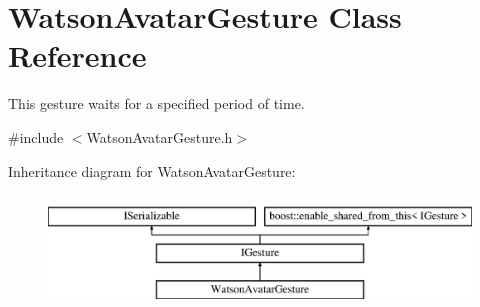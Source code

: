\hypertarget{class_watson_avatar_gesture}{}\section{Watson\+Avatar\+Gesture Class Reference}
\label{class_watson_avatar_gesture}


This gesture waits for a specified period of time.  




{\ttfamily \#include $<$Watson\+Avatar\+Gesture.\+h$>$}

Inheritance diagram for Watson\+Avatar\+Gesture\+:\begin{figure}[H]
\begin{center}
\leavevmode
\includegraphics[height=3.000000cm]{class_watson_avatar_gesture}
\end{center}
\end{figure}
